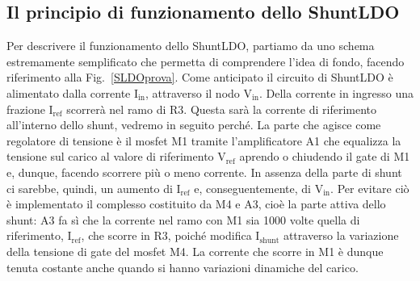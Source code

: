 
\subsection{Il principio di funzionamento dello ShuntLDO}

Per descrivere il funzionamento dello ShuntLDO, partiamo da uno schema estremamente semplificato che permetta di comprendere l'idea di fondo, facendo riferimento alla Fig.~\ref{SLDOprova}. 
Come anticipato il circuito di ShuntLDO è alimentato dalla corrente $\mathrm{I_{in}}$, attraverso il nodo $\mathrm{V_{in}}$.  Della corrente in ingresso una frazione $\mathrm{I_\mathrm{ref}}$ scorrerà nel ramo di R3. Questa sarà la corrente di riferimento all'interno dello shunt, vedremo in seguito perché. 
La parte che agisce come regolatore di tensione è il mosfet M1 tramite l'amplificatore A1 che equalizza la tensione sul carico al valore di riferimento $\mathrm{V_{ref}}$ aprendo o chiudendo il gate di M1 e, dunque, facendo scorrere più o meno corrente. 
In assenza della parte di shunt ci sarebbe, quindi, un aumento di $\mathrm{I_{ref}}$ e, conseguentemente, di $\mathrm{V_{in}}$. 
 Per evitare ciò è implementato il complesso costituito da M4 e A3, cioè la parte attiva dello shunt: A3 fa sì che la corrente nel ramo con M1 sia 1000 volte quella di riferimento, $\mathrm{I_{ref}}$, che scorre in R3, poiché modifica $\mathrm{I_{shunt}}$ attraverso la variazione della tensione di gate del mosfet M4. 
La corrente che scorre in M1 è dunque tenuta costante anche quando si hanno variazioni dinamiche del carico.
